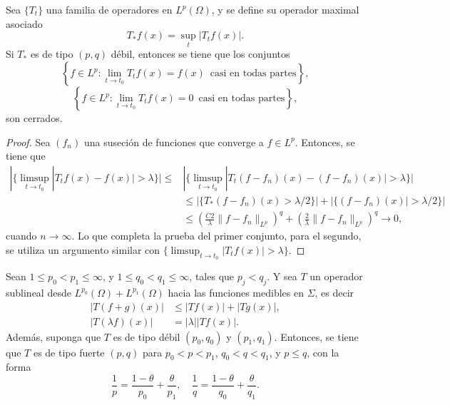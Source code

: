 \begin{theorem}\label{theo:weak-closed}
	Sea $\{T_t\}$ una familia de operadores en $L^p(\Omega)$, y se define su operador maximal asociado 
	\begin{equation*}
		T_*f(x) = \sup_t |T_tf(x)|.
	\end{equation*}
	Si $T_*$ es de tipo $(p,q)$ débil, entonces se tiene que los conjuntos
	\begin{equation*}
		\left\{f\in L^p: \lim_{t\to t_0} T_tf(x) = f(x)\, \text{ casi en todas partes} \right\},
	\end{equation*}
	\begin{equation*}
		\left\{f\in L^p: \lim_{t\to t_0} T_tf(x) = 0\, \text{ casi en todas partes} \right\},
	\end{equation*}
	son cerrados.
\end{theorem}
\begin{proof}
	Sea $(f_n)$ una suseción de funciones que converge a $f\in L^p$. Entonces, se tiene que 
	\begin{align*}
		|\{\limsup_{t\to t_0} |T_tf(x) - f(x)| > \lambda \}| \leq & |\{\limsup_{t\to t_0} |T_t(f-f_n)(x) - (f-f_n)(x)| >\lambda \}| \\
		& \leq |\{T_*(f-f_n)(x)>\lambda/2 \}| +  |\{(f-f_n)(x)| >\lambda/2 \}| \\
		& \leq \left(\frac{C2}{\lambda}\|f-f_n\|_{L^p}\right)^q + \left(\frac{2}{\lambda}\|f-f_n\|_{L^p}\right)^q \to 0,
	\end{align*}
	cuando $n\to\infty$. Lo que completa la prueba del primer conjunto, para el segundo, se utiliza un argumento similar con $\{\limsup_{t\to t_0}|T_tf(x)|>\lambda\}$.
\end{proof}
\begin{theorem}
	Sean $1\leq p_0 < p_1 \leq \infty$, y $1\leq q_0 < q_1 \leq \infty$, tales que $p_j<q_j$. Y sea $T$ un operador sublineal desde $L^{p_0}(\Omega)+L^{p_1}(\Omega)$ hacia las funciones medibles en $\Sigma$, es decir 
	\begin{align*}
		|T(f+g)(x)| & \leq |Tf(x)| + |Tg(x)|,\\
		|T(\lambda f)(x)| &= |\lambda||Tf(x)|.
	\end{align*}
	Además, suponga que $T$ es de tipo débil $(p_0, q_0)$ y $(p_1, q_1)$. Entonces, se tiene que $T$ es de tipo fuerte $(p, q)$ para $p_0<p<p_1$, $q_0<q<q_1$, y $p\leq q$, con la forma 
	\begin{equation*}
		\frac{1}{p} = \frac{1-\theta}{p_0} + \frac{\theta}{p_1}, \quad \frac{1}{q} = \frac{1-\theta}{q_0} + \frac{\theta}{q_1}.
	\end{equation*}
\end{theorem}
